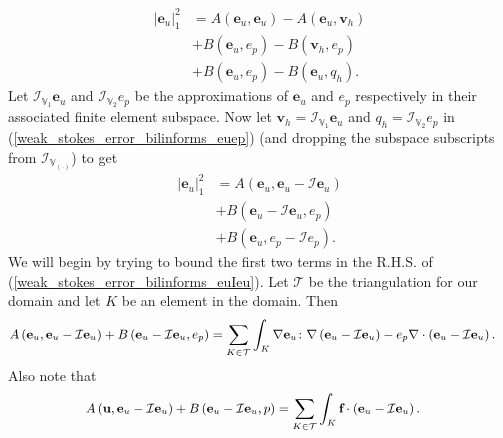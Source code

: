 \documentclass[12pt,a4paper]{article}
\theoremstyle{definition}
\begin{document}
\begin{equation} \label{weak_stokes_error_bilinforms_euep}
\begin{aligned}
\left|\textbf{e}_u\right|^2_1 &=A\left(\textbf{e}_u,\textbf{e}_u\right)-A\left(\textbf{e}_u,\textbf{v}_h\right)\\
&+B\left(\textbf{e}_u,e_p\right)-B\left(\textbf{v}_h,e_p\right)\\
&+B\left(\textbf{e}_u,e_p\right)-B\left(\textbf{e}_u,q_h\right).
\end{aligned}
\end{equation}
Let $\mathcal{I}_{\mathbb{V}_1}\textbf{e}_u$ and $\mathcal{I}_{\mathbb{V}_2}e_p$ be the approximations of $\textbf{e}_u$ and $e_p$  respectively in their associated finite element subspace.  Now let $\textbf{v}_h= \mathcal{I}_{\mathbb{V}_1}\textbf{e}_u$  and $q_h=\mathcal{I}_{\mathbb{V}_2}e_p$ in (\ref{weak_stokes_error_bilinforms_euep}) (and dropping the subspace subscripts from $\mathcal{I}_{\mathbb{V}_{\left(\cdot\right)}}$) to get 
\begin{equation} \label{weak_stokes_error_bilinforms_euIeu}
\begin{aligned}
\left|\textbf{e}_u\right|^2_1 &=A\left(\textbf{e}_u,\textbf{e}_u-\mathcal{I}\textbf{e}_u\right)\\
&+B\left(\textbf{e}_u-\mathcal{I}\textbf{e}_u,e_p\right)\\
&+B\left(\textbf{e}_u,e_p-\mathcal{I}e_p\right).
\end{aligned}
\end{equation}
We will begin by trying to bound the first two terms in the R.H.S. of (\ref{weak_stokes_error_bilinforms_euIeu}).  Let $\mathcal{T}$ be the triangulation for our domain and let $K$ be an element in the domain. Then
\begin{equation} \small \label{weak_stokes_error_firsttwo}
\begin{aligned}
A\left(\textbf{e}_u,\textbf{e}_u-\mathcal{I}\textbf{e}_u\right)
+B\left(\textbf{e}_u-\mathcal{I}\textbf{e}_u,e_p\right)&= \sum_{K\in\mathcal{T}}\int_{K}\nabla\textbf{e}_u\colon\nabla\left(\textbf{e}_u-\mathcal{I}\textbf{e}_u\right)- e_p\nabla\cdot\left(\textbf{e}_u-\mathcal{I}\textbf{e}_u\right).
\end{aligned}
\end{equation}
Also note that
\begin{equation} \small
\begin{aligned}
A\left(\textbf{u},\textbf{e}_u-\mathcal{I}\textbf{e}_u\right)
+B\left(\textbf{e}_u-\mathcal{I}\textbf{e}_u,p\right)&= \sum_{K\in\mathcal{T}}\int_{K}\textbf{f}\cdot\left(\textbf{e}_u-\mathcal{I}\textbf{e}_u\right).
\end{aligned}
\end{equation}
\end{document}
